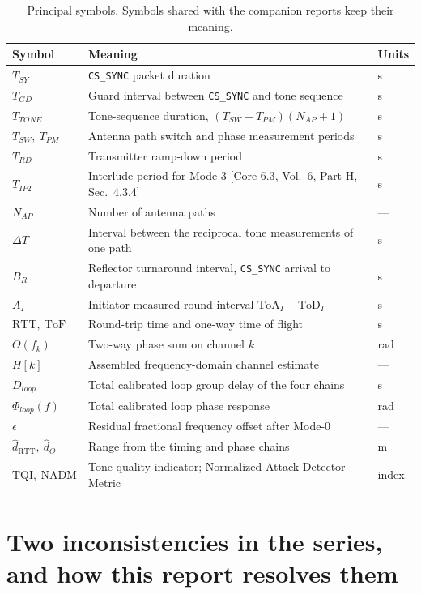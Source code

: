 \documentclass[11pt,a4paper]{article}
\newcommand{\ToF}{\mathrm{ToF}}
\newcommand{\RTT}{\mathrm{RTT}}
\newcommand{\TQI}{\mathrm{TQI}}
\newcommand{\NADM}{\mathrm{NADM}}
\newcommand{\ToD}{\mathrm{ToD}}
\newcommand{\ToA}{\mathrm{ToA}}
\newcommand{\Tsy}{T_{SY}}
\newcommand{\Tgd}{T_{GD}}
\newcommand{\Ttone}{T_{TONE}}
\newcommand{\Tsw}{T_{SW}}
\newcommand{\Tpm}{T_{PM}}
\newcommand{\Trd}{T_{RD}}
\newcommand{\Nap}{N_{AP}}
\newcommand{\code}[1]{\texttt{\small #1}}
\newcommand{\core}[1]{\textcolor{rulegrey}{\small[Core 6.3, #1]}}
\begin{document}
\begin{table}[h]
\caption{Principal symbols. Symbols shared with the companion reports keep their meaning.}
\label{tab:symbols}
\centering\small
\begin{tabular}{@{}L{28mm}L{78mm}L{22mm}@{}}
\toprule
Symbol & Meaning & Units \\
\midrule
$\Tsy$ & \code{CS\_SYNC} packet duration & s \\
$\Tgd$ & Guard interval between \code{CS\_SYNC} and tone sequence & s \\
$\Ttone$ & Tone-sequence duration, $(\Tsw+\Tpm)(\Nap+1)$ & s \\
$\Tsw,\ \Tpm$ & Antenna path switch and phase measurement periods & s \\
$\Trd$ & Transmitter ramp-down period & s \\
$T_{IP2}$ & Interlude period for Mode-3 \core{Vol.\ 6, Part H, Sec.\ 4.3.4} & s \\
$\Nap$ & Number of antenna paths & --- \\
$\Delta T$ & Interval between the reciprocal tone measurements of one path & s \\
$B_R$ & Reflector turnaround interval, \code{CS\_SYNC} arrival to departure & s \\
$A_I$ & Initiator-measured round interval $\ToA_I-\ToD_I$ & s \\
$\RTT,\ \ToF$ & Round-trip time and one-way time of flight & s \\
$\Theta(f_k)$ & Two-way phase sum on channel $k$ & rad \\
$H[k]$ & Assembled frequency-domain channel estimate & --- \\
$D_{loop}$ & Total calibrated loop group delay of the four chains & s \\
$\Phi_{loop}(f)$ & Total calibrated loop phase response & rad \\
$\epsilon$ & Residual fractional frequency offset after Mode-0 & --- \\
$\hat d_{\RTT},\ \hat d_{\Theta}$ & Range from the timing and phase chains & m \\
$\TQI,\ \NADM$ & Tone quality indicator; Normalized Attack Detector Metric & index \\
\bottomrule
\end{tabular}
\end{table}

\section{Two inconsistencies in the series, and how this report resolves them}
\label{sec:discrepancies}
\end{document}
